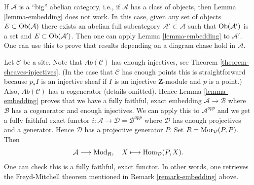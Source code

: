 \begin{remark}
\label{remark-embedding-big}
If $\mathcal{A}$ is a ``big'' abelian category, i.e., if $\mathcal{A}$
has a class of objects, then
Lemma \ref{lemma-embedding}
does not work. In this case, given any set of objects
$E \subset \mathop{\mathrm{Ob}}\nolimits(\mathcal{A})$ there exists an abelian full subcategory
$\mathcal{A}' \subset \mathcal{A}$ such that
$\mathop{\mathrm{Ob}}\nolimits(\mathcal{A}')$ is a set and $E \subset \mathop{\mathrm{Ob}}\nolimits(\mathcal{A}')$.
Then one can apply
Lemma \ref{lemma-embedding}
to $\mathcal{A}'$. One can use this to prove that results depending on
a diagram chase hold in $\mathcal{A}$.
\end{remark}

\begin{remark}
\label{remark-embedding-freyd}
Let $\mathcal{C}$ be a site.
Note that $\textit{Ab}(\mathcal{C})$ has enough injectives, see
Theorem \ref{theorem-sheaves-injectives}.
(In the case that $\mathcal{C}$ has enough points this is straightforward
because  $p_*I$ is an injective sheaf if $I$ is an injective
$\mathbf{Z}$-module and $p$ is a point.)
Also, $\textit{Ab}(\mathcal{C})$ has a cogenerator (details omitted).
Hence
Lemma \ref{lemma-embedding}
proves that we have a fully faithful, exact embedding
$\mathcal{A} \to \mathcal{B}$ where $\mathcal{B}$ has a
cogenerator and enough injectives.
We can apply this to $\mathcal{A}^{opp}$ and we get a
fully faithful exact functor
$i : \mathcal{A} \to \mathcal{D} = \mathcal{B}^{opp}$
where $\mathcal{D}$ has enough projectives and a generator. Hence
$\mathcal{D}$ has a projective generator $P$.
Set $R = \mathop{\mathrm{Mor}}\nolimits_\mathcal{D}(P, P)$. Then
$$
\mathcal{A} \longrightarrow \text{Mod}_R, \quad
X \longmapsto \mathop{\mathrm{Hom}}\nolimits_\mathcal{D}(P, X).
$$
One can check this is a fully faithful, exact functor.
In other words, one retrieves the
Freyd-Mitchell theorem mentioned in
Remark \ref{remark-embedding}
above.
\end{remark}

